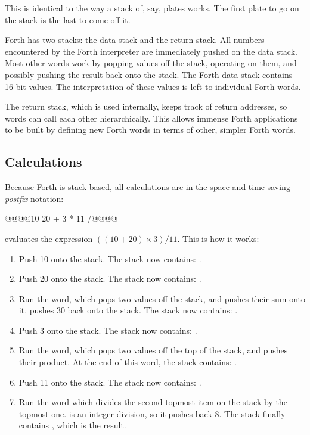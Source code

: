 This is identical to the way a stack of, say, plates works. The first plate to
go on the stack is the last to come off it.

Forth has two stacks: the data stack and the return stack. All numbers
encountered by the Forth interpreter are immediately pushed on the data
stack. Most other words work by popping values off the stack, operating on
them, and possibly pushing the result back onto the stack. The Forth data stack
contains 16-bit values. The interpretation of these values is left to
individual Forth words.

The return stack, which is used internally, keeps track of return addresses, so
words can call each other hierarchically. This allows immense Forth
applications to be built by defining new Forth words in terms of other, simpler
Forth words.

\subsection{Calculations}

Because Forth is stack based, all calculations are in the space and time saving
{\em\gls{postfix}} notation:

\begin{intrcode}
@@@@10 20 + 3 * 11 /@@@@
\end{intrcode}

\noindent evaluates the expression $((10 + 20) \times 3) / 11$. This is how it
works:

\begin{enumerate}
\item Push 10 onto the stack. The stack now contains: .
\item Push 20 onto the stack. The stack now contains: .
\item Run the \fw{+} word, which pops two values off the stack, and pushes
  their sum onto it. \fw{+} pushes 30 back onto the stack. The stack now
  contains: .
\item Push 3 onto the stack. The stack now contains: .
\item Run the \fw{*} word, which pops two values off the top of the stack, and
  pushes their product. At the end of this word, the stack contains:
  .
\item Push 11 onto the stack. The stack now contains: .
\item Run the \fw{/} word which divides the second topmost item on the stack by
  the topmost one. \fw{/} is an integer division, so it pushes back 8. The
  stack finally contains , which is the result.
\end{enumerate}

